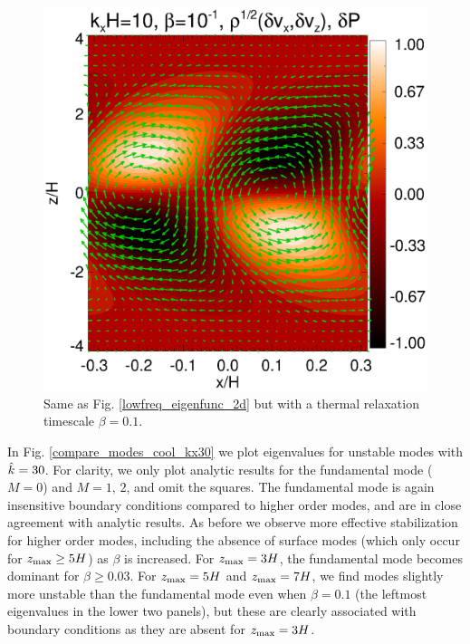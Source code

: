 \begin{figure}
  \includegraphics[width=\linewidth]{figures/result2d_cool}
  \caption{Same as  Fig. \ref{lowfreq_eigenfunc_2d} but with a thermal
    relaxation timescale $\beta=0.1$. 
    \label{lowfreq_eigenfunc_2d_cool}
  }
\end{figure}

In Fig. \ref{compare_modes_cool_kx30} we plot eigenvalues for unstable
modes with $\hat{k}=30$. For clarity, we only plot analytic results 
for the fundamental mode ($M=0$) and $M=1,\,2$, and omit the
squares. The fundamental mode is again insensitive boundary
conditions compared to higher order modes, and are in close agreement
with analytic results. As before we observe more effective
stabilization for higher order modes, including the absence of surface
modes (which only occur for $z_\mathrm{max}\geq 5H$) as $\beta$ is increased.  
For $z_\mathrm{max}=3H$, the fundamental mode becomes dominant for $\beta\geq
0.03$. For $z_\mathrm{max}=5H$ and $z_\mathrm{max}=7H$, we
find modes slightly more unstable than the fundamental
mode even when $\beta=0.1$ (the leftmost eigenvalues in the lower two
panels), but these are clearly associated with boundary
conditions as they are absent for $z_\mathrm{max}=3H$. 

